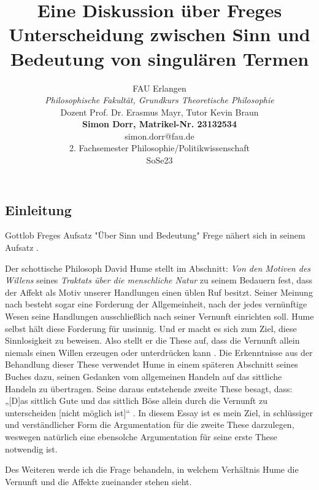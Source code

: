 \documentclass[ngerman,12pt]{diazessay} %
\title{\textbf{Eine Diskussion über Freges Unterscheidung zwischen Sinn und Bedeutung von singulären Termen} \\
\vspace{3em}
{\Large\itshape \vspace{4em}}} %
\author{
FAU Erlangen \\
\textit{Philosophische Fakultät, Grundkurs Theoretische Philosophie} \\
Dozent Prof. Dr. Erasmus Mayr, Tutor Kevin Braun \\
\textbf{Simon Dorr, Matrikel-Nr. 23132534} \\
simon.dorr@fau.de \\
2. Fachsemester Philosophie/Politikwissenschaft \\
SoSe23
} %
\begin{document}
\begin{doublespace}
\maketitle %
\newpage


\tableofcontents
\newpage

\section{Einleitung}

Gottlob Freges Aufsatz "Über Sinn und Bedeutung"
Frege nähert sich in seinem Aufsatz .
\par\bigskip   
Der schottische Philosoph David Hume stellt im Abschnitt: \textit{Von den Motiven des Willens} seines \textit{Traktats über die menschliche Natur} zu seinem Bedauern fest, dass der Affekt als Motiv unserer Handlungen einen üblen Ruf besitzt. Seiner Meinung nach besteht sogar eine Forderung der Allgemeinheit, nach der jedes vernünftige Wesen seine Handlungen ausschließlich nach seiner Vernunft einrichten soll. Hume selbst hält diese Forderung für unsinnig. Und er macht es sich zum Ziel, diese Sinnlosigkeit zu beweisen. Also stellt er die These auf, dass die Vernunft allein niemals einen Willen erzeugen oder unterdrücken kann \cite[siehe S.484]{Hume.2013}. Die Erkenntnisse aus der Behandlung dieser These verwendet Hume in einem späteren Abschnitt seines Buches dazu, seinen Gedanken vom allgemeinen Handeln auf das sittliche Handeln zu übertragen. Seine daraus entstehende zweite These besagt, dass: „[D]as sittlich Gute und das sittlich Böse allein durch die Vernunft zu unterscheiden [nicht möglich ist]“ \cite[S.433]{Hume.2013}. In diesem Essay ist es mein Ziel, in schlüssiger und verständlicher Form die Argumentation für die zweite These darzulegen, weswegen natürlich eine ebensolche Argumentation für seine erste These notwendig ist.
\par\bigskip   
Des Weiteren werde ich die Frage behandeln, in welchem Verhältnis Hume die Vernunft und die Affekte zueinander stehen sieht.


\end{doublespace}
\end{document}
